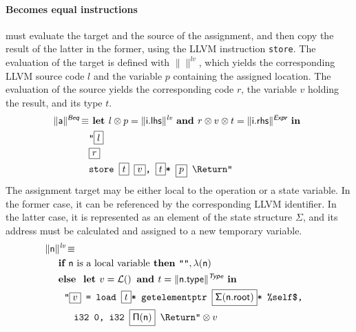 \documentclass{llncs}
\newcommand{\trad}[2]{\ensuremath{\lVert \textsf{#1} \rVert^{\textit{#2}}}}
\newcommand{\nl}[0]{\text{\Return}}
\DeclareMathOperator{\conc}{\diamond}
\DeclareMathOperator{\isdef}{\equiv}
\DeclareMathOperator{\name}{\mathcal{L}()}
\newcommand{\llvm}[1]{\texttt{#1}}
\newcommand{\B}[1]{\textsf{#1}}
\newcommand{\IF}[0]{\textbf{ if }}
\newcommand{\ELSE}[0]{\textbf{ else }}
\newcommand{\THEN}[0]{\textbf{ then }}
\newcommand{\LET}[0]{\textbf{ let }}
\newcommand{\IN}[0]{\textbf{ in }}
\newcommand{\AND}[0]{\textbf{ and }}
\newcommand{\PH}[1]{\framebox{$#1$}}
\newcommand{\sep}[0]{\otimes}
\newcommand{\local}[0]{\ensuremath{\sf\lambda}}
\newcommand{\idx}[0]{\ensuremath{\sf\Pi}}
\newcommand{\state}[0]{\ensuremath{\sf\Sigma}}
\begin{document}
\paragraph{Becomes equal instructions} must evaluate the target and the source
of the assignment, and then copy the result of the latter in the former, using
the LLVM instruction \llvm{store}. The evaluation of the target is defined with
$\trad{}{lv}$, which yields the corresponding LLVM source code $l$ and the
variable $p$ containing the assigned location. The evaluation of the source
yields the corresponding code $r$, the variable $v$ holding the result, and its
type $t$.
\begin{align*}
\begin{split}
  \trad{a}{\B{Beq}} \isdef 
  & \LET l \sep p = \trad{i.lhs}{lv} \AND r \sep v \sep t = \trad{i.rhs}{\B{Expr}} \IN \\
  & \llvm{"\PH{l}} \\
  & \llvm{\PH{r}} \\
  & \llvm{store \PH{t} \PH{v}, \PH{t}* \PH{p} \nl"}
\end{split}
\end{align*}
The assignment target may be either local to the operation or a state
variable. In the former case, it can be referenced by the corresponding LLVM
identifier. In the latter case, it is represented as an element of the state
structure $\Sigma$, and its address must be calculated and assigned to a new temporary
variable.
\begin{align*}
\lefteqn{\trad{n}{lv} \isdef} \\
& \quad \IF \mbox{\B{n} is a local variable} \THEN \llvm{""}, \local(\B{n}) \\
& \quad \ELSE \LET v = \name \AND t = \trad{n.type}{\B{Type}} \IN \\
& \quad \quad \llvm{"\PH{v} = load \PH{t}* getelementptr \PH{\state(\B{n.root})}* \%self\$,} \\
& \quad \quad \quad \llvm{i32 0, i32 \PH{\idx(\B{n})} \nl"} \sep v
\end{align*}
\end{document}

